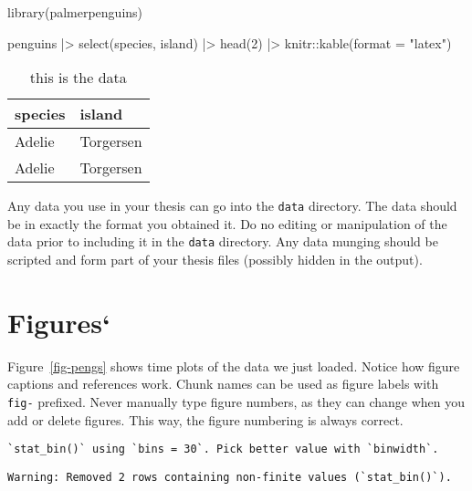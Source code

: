 \documentclass[12pt]{report}
\newenvironment{Shaded}{\begin{snugshade}}{\end{snugshade}}
\newcommand{\AttributeTok}[1]{\textcolor[rgb]{0.40,0.45,0.13}{#1}}
\newcommand{\DecValTok}[1]{\textcolor[rgb]{0.68,0.00,0.00}{#1}}
\newcommand{\FunctionTok}[1]{\textcolor[rgb]{0.28,0.35,0.67}{#1}}
\newcommand{\NormalTok}[1]{\textcolor[rgb]{0.00,0.23,0.31}{#1}}
\newcommand{\SpecialCharTok}[1]{\textcolor[rgb]{0.37,0.37,0.37}{#1}}
\newcommand{\StringTok}[1]{\textcolor[rgb]{0.13,0.47,0.30}{#1}}
\begin{document}
\begin{Shaded}
\begin{Highlighting}[]
\FunctionTok{library}\NormalTok{(palmerpenguins)}

\NormalTok{penguins }\SpecialCharTok{|\textgreater{}}
\FunctionTok{select}\NormalTok{(species, island) }\SpecialCharTok{|\textgreater{}}
\FunctionTok{head}\NormalTok{(}\DecValTok{2}\NormalTok{) }\SpecialCharTok{|\textgreater{}}
\NormalTok{knitr}\SpecialCharTok{::}\FunctionTok{kable}\NormalTok{(}\AttributeTok{format =} \StringTok{"latex"}\NormalTok{)}
\end{Highlighting}
\end{Shaded}

\begin{table}
\caption{this is the data}\tabularnewline

\centering
\begin{tabular}{l|l}
\hline
species & island\\
\hline
Adelie & Torgersen\\
\hline
Adelie & Torgersen\\
\hline
\end{tabular}
\end{table}

Any data you use in your thesis can go into the \texttt{data} directory.
The data should be in exactly the format you obtained it. Do no editing
or manipulation of the data prior to including it in the \texttt{data}
directory. Any data munging should be scripted and form part of your
thesis files (possibly hidden in the output).

\hypertarget{figures}{%
\section{Figures`}\label{figures}}

Figure~\ref{fig-pengs} shows time plots of the data we just loaded.
Notice how figure captions and references work. Chunk names can be used
as figure labels with \texttt{fig-} prefixed. Never manually type figure
numbers, as they can change when you add or delete figures. This way,
the figure numbering is always correct.

\begin{verbatim}
`stat_bin()` using `bins = 30`. Pick better value with `binwidth`.
\end{verbatim}

\begin{verbatim}
Warning: Removed 2 rows containing non-finite values (`stat_bin()`).
\end{verbatim}
\end{document}
